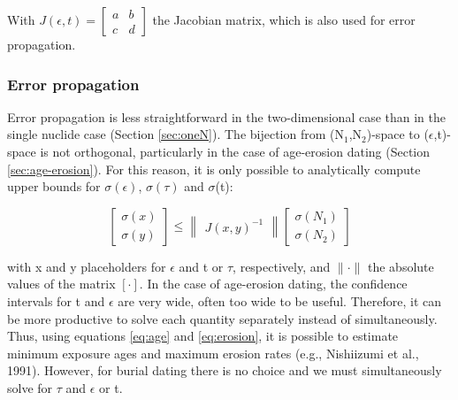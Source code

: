 \documentclass{article}
\begin{document}
With  $J(\epsilon,t) = \begin{bmatrix}a&b\\c&d\end{bmatrix}$ the Jacobian  matrix, which
is also used for error propagation.

\subsubsection{Error propagation}\label{sec:error}

Error propagation is less  straightforward in the two-dimensional case
than  in  the  single  nuclide  case  (Section  \ref{sec:oneN}).   The
bijection  from  (N$_1$,N$_2$)-space  to ($\epsilon$,t)-space  is  not
orthogonal, particularly  in the  case of age-erosion  dating (Section
\ref{sec:age-erosion}).   For  this reason,  it  is  only possible  to
analytically    compute   upper    bounds    for   $\sigma(\epsilon)$,
$\sigma(\tau)$ and $\sigma$(t):

\begin{equation}
  \label{eq:2dError}
\begin{bmatrix}
\sigma(x)\\ 
\sigma(y) 
\end{bmatrix}
\leq
\begin{Vmatrix}
J(x,y)^{-1}
\end{Vmatrix}
\begin{bmatrix}
\sigma(N_1)\\
\sigma(N_2)
\end{bmatrix}
\end{equation}

with  x   and  y  placeholders   for  $\epsilon$  and  t   or  $\tau$,
respectively,  and $\lVert \cdot  \rVert$ the  absolute values  of the
matrix $\left [  \cdot \right ]$.  In the  case of age-erosion dating,
the confidence intervals for t and $\epsilon$ are very wide, often too
wide to be useful.  Therefore, it can be more productive to solve each
quantity separately instead  of simultaneously.  Thus, using equations
\ref{eq:age} and \ref{eq:erosion}, it  is possible to estimate minimum
exposure  ages and  maximum erosion  rates (e.g.,  Nishiizumi  et al.,
1991).   However, for burial  dating there  is no  choice and  we must
simultaneously solve for $\tau$ and $\epsilon$ or t.
\\
\end{document}
